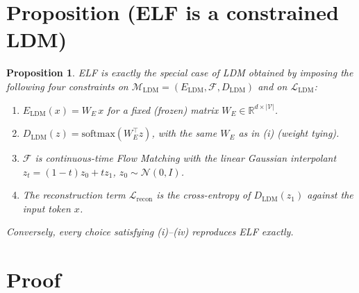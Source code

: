 \documentclass[11pt]{article}
\newtheorem{proposition}{Proposition}
\begin{document}
\section*{Proposition (ELF is a constrained LDM)}

\begin{proposition}\label{prop:elf-ldm}
ELF is exactly the special case of LDM obtained by imposing the following
four constraints on $\mathcal{M}_{\mathrm{LDM}} = (E_{\mathrm{LDM}}, \mathcal{F}, D_{\mathrm{LDM}})$
and on $\mathcal{L}_{\mathrm{LDM}}$:
\begin{enumerate}
  \item[(i)]   $E_{\mathrm{LDM}}(x) = W_{E}\,x$ for a fixed (frozen) matrix
               $W_{E}\in\mathbb{R}^{d\times|\mathcal{V}|}$.
  \item[(ii)]  $D_{\mathrm{LDM}}(z) = \mathrm{softmax}(W_{E}^{\top} z)$, with
               the \emph{same} $W_{E}$ as in (i) (weight tying).
  \item[(iii)] $\mathcal{F}$ is continuous-time Flow Matching with the linear
               Gaussian interpolant
               $z_{t}=(1-t)z_{0}+t z_{1}$, $z_{0}\sim\mathcal{N}(0,I)$.
  \item[(iv)]  The reconstruction term $\mathcal{L}_{\mathrm{recon}}$ is the
               cross-entropy of $D_{\mathrm{LDM}}(z_{1})$ against the input
               token $x$.
\end{enumerate}
Conversely, every choice satisfying \textup{(i)--(iv)} reproduces ELF
exactly.
\end{proposition}

\section*{Proof}
\end{document}
